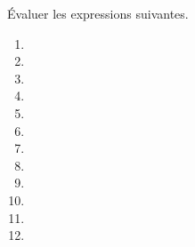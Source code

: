 \'Evaluer les expressions suivantes.
\begin{multicols}{4}
  \begin{enumerate}[label=\emph{\alph*)}]
    \item {}
    \item {}
    \item {}
    \item {}
    \item {}
    \item {}
    \item {}
    \item {}
    \item {}
    \item {}
    \item {}
    \item {}
  \end{enumerate}
\end{multicols}